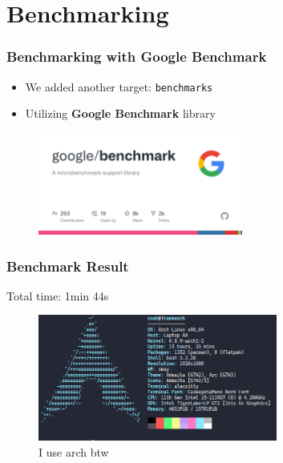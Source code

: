 
\section{Benchmarking}

\begin{frame}
    \frametitle{Benchmarking with Google Benchmark}

    \begin{itemize}
        \item We added another target: \texttt{benchmarks}
        \item Utilizing \textbf{Google Benchmark} library
    \end{itemize}
    \begin{figure}[H]
        \includegraphics[width=0.6\textwidth]{res/gbench.png}
    \end{figure}
\end{frame}

\begin{frame}
    \frametitle{Benchmark Result}

    Total time: 1min 44s

    \begin{figure}[H]
        \includegraphics[width=0.7\textwidth]{res/neofetch.png}
        \caption{I use arch btw}
    \end{figure}
\end{frame}
